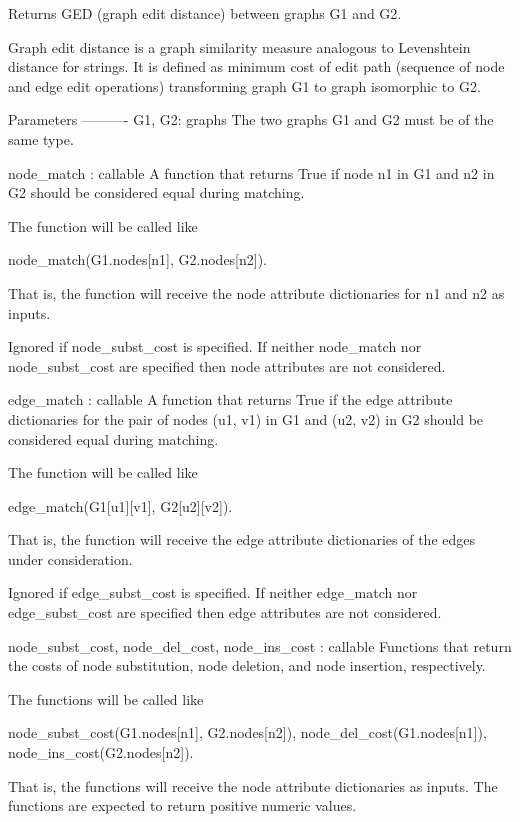 \begin{DoxyVerb}Returns GED (graph edit distance) between graphs G1 and G2.

Graph edit distance is a graph similarity measure analogous to
Levenshtein distance for strings.  It is defined as minimum cost
of edit path (sequence of node and edge edit operations)
transforming graph G1 to graph isomorphic to G2.

Parameters
----------
G1, G2: graphs
    The two graphs G1 and G2 must be of the same type.

node_match : callable
    A function that returns True if node n1 in G1 and n2 in G2
    should be considered equal during matching.

    The function will be called like

       node_match(G1.nodes[n1], G2.nodes[n2]).

    That is, the function will receive the node attribute
    dictionaries for n1 and n2 as inputs.

    Ignored if node_subst_cost is specified.  If neither
    node_match nor node_subst_cost are specified then node
    attributes are not considered.

edge_match : callable
    A function that returns True if the edge attribute dictionaries
    for the pair of nodes (u1, v1) in G1 and (u2, v2) in G2 should
    be considered equal during matching.

    The function will be called like

       edge_match(G1[u1][v1], G2[u2][v2]).

    That is, the function will receive the edge attribute
    dictionaries of the edges under consideration.

    Ignored if edge_subst_cost is specified.  If neither
    edge_match nor edge_subst_cost are specified then edge
    attributes are not considered.

node_subst_cost, node_del_cost, node_ins_cost : callable
    Functions that return the costs of node substitution, node
    deletion, and node insertion, respectively.

    The functions will be called like

       node_subst_cost(G1.nodes[n1], G2.nodes[n2]),
       node_del_cost(G1.nodes[n1]),
       node_ins_cost(G2.nodes[n2]).

    That is, the functions will receive the node attribute
    dictionaries as inputs.  The functions are expected to return
    positive numeric values.


\end{DoxyVerb}
